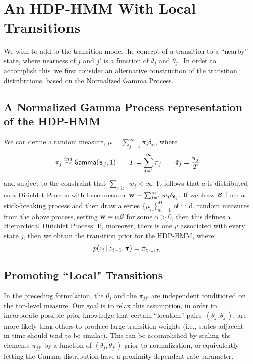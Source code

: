 \section{An HDP-HMM With Local Transitions}
\label{sec:model}
We wish to add to the transition model the concept of a transition to
a ``nearby'' state, where nearness of $j$ and $j'$ is a function of
$\theta_j$ and $\theta_{j'}$.  In order to accomplish this, we first
consider an alternative construction of the transition distributions,
based on the Normalized Gamma Process.

\subsection{A Normalized Gamma Process representation of the HDP-HMM}
\label{sec:normalized-gamma}

We can define a random measure, $\mu = \sum_{j=1}^{\infty} \pi_j \delta_{\theta_j}$, where 
\begin{align}
  \pi_j \stackrel{ind}{\sim} \mathsf{Gamma}(w_j,1) \qquad T =
  \sum_{j=1}^{\infty} \pi_j \qquad
  \tilde{\pi}_j = \frac{\pi_j}{T} \label{eq:20}
\end{align}
and subject to the constraint that $\sum_{j\geq 1} w_j < \infty$.  It
follows \cite{paisley2012discrete, favaro2013mcmc} that $\mu$ is distributed as a Dirichlet
Process with base measure $\mathbf{w} = \sum_{j=1}^{\infty} w_j \delta_{\theta_j}$.
If we draw $\boldsymbol{\beta}$ from a stick-breaking process and then draw a
series $\{\mu_m\}_{m=1}^M$ of
i.i.d. random measures from the above process, setting $\mathbf{w} =
\alpha\boldsymbol{\beta}$ for some $\alpha > 0$, then
this defines a Hierarchical Dirichlet Process.  If, moreover, there is
one $\mu$ associated with every state $j$, then we obtain the
transition prior for the HDP-HMM, where
\begin{align}
  \label{eq:50}
  p(z_t \, \vert \, z_{t-1}, \boldsymbol{\pi}) = \tilde{\pi}_{z_{t-1}z_t}
\end{align}

\subsection{Promoting ``Local" Transitions}
\label{sec:prom-local-trans}

In the preceding formulation, the $\theta_j$ and the $\pi_{jj'}$ are independent
conditioned on the top-level measure.  Our goal is to relax this
assumption, in order to incorporate possible prior knowledge
that certain ``location'' pairs, $(\theta_j, \theta_{j'})$, are more likely than others to
produce large transition weights (i.e., states adjacent in time should
tend to be similar).  This can be accomplished by scaling the elements
$\pi_{jj'}$ by a function of $(\theta_{j}, \theta_{j'})$ prior to
normalization, or equivalently letting the Gamma distribution have
a proximity-dependent rate parameter.  


